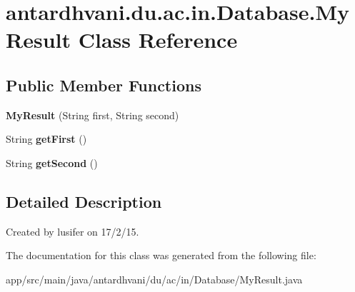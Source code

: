 \hypertarget{classantardhvani_1_1du_1_1ac_1_1in_1_1_database_1_1_my_result}{}\section{antardhvani.\+du.\+ac.\+in.\+Database.\+My\+Result Class Reference}
\label{classantardhvani_1_1du_1_1ac_1_1in_1_1_database_1_1_my_result}
\subsection*{Public Member Functions}
\begin{DoxyCompactItemize}
\item 
\hypertarget{classantardhvani_1_1du_1_1ac_1_1in_1_1_database_1_1_my_result_ac4b54ca1720db97bec2aa940e9c77997}{}{\bfseries My\+Result} (String first, String second)\label{classantardhvani_1_1du_1_1ac_1_1in_1_1_database_1_1_my_result_ac4b54ca1720db97bec2aa940e9c77997}

\item 
\hypertarget{classantardhvani_1_1du_1_1ac_1_1in_1_1_database_1_1_my_result_a91bbf5c67c46c33e3f4fbe6a02c4f295}{}String {\bfseries get\+First} ()\label{classantardhvani_1_1du_1_1ac_1_1in_1_1_database_1_1_my_result_a91bbf5c67c46c33e3f4fbe6a02c4f295}

\item 
\hypertarget{classantardhvani_1_1du_1_1ac_1_1in_1_1_database_1_1_my_result_a7a93c66d5550430b5c3cb39b58e1dbd9}{}String {\bfseries get\+Second} ()\label{classantardhvani_1_1du_1_1ac_1_1in_1_1_database_1_1_my_result_a7a93c66d5550430b5c3cb39b58e1dbd9}

\end{DoxyCompactItemize}


\subsection{Detailed Description}
Created by lusifer on 17/2/15. 

The documentation for this class was generated from the following file\+:\begin{DoxyCompactItemize}
\item 
app/src/main/java/antardhvani/du/ac/in/\+Database/My\+Result.\+java\end{DoxyCompactItemize}
